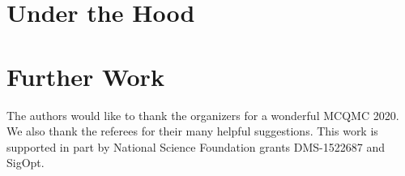 \documentclass[graybox,footinfo]{svmult}
\begin{document}
\section{Under the Hood}



\section{Further Work} \label{sec:further}


\begin{acknowledgement}
The authors would like to thank the organizers for a wonderful MCQMC 2020. 
We also thank the referees for their many helpful suggestions.  This work is supported in part by National Science Foundation grants DMS-1522687 and SigOpt.


\end{acknowledgement}



\end{document}
